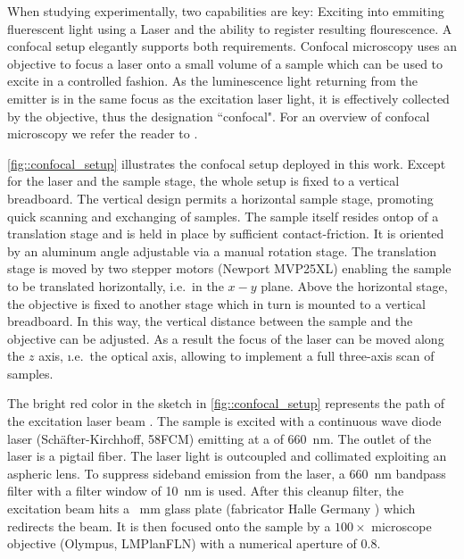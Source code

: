 		When studying \sivs experimentally, two capabilities are key: Exciting \sivs into emmiting fluerescent light using a Laser and the ability to register resulting \siv flourescence. A confocal setup elegantly supports both requirements. Confocal microscopy uses an objective to focus a laser onto a small volume of a sample which can be used to excite \sivs in a controlled fashion. As the luminescence light returning from the emitter is in the same focus as the excitation laser light, it is effectively collected by the objective, thus the designation ``confocal". For an overview of confocal microscopy we refer the reader to \cite{janine::237}.


		\autoref{fig::confocal_setup} illustrates the confocal setup deployed in this work.
		Except for the laser and the sample stage, the whole setup is fixed to a vertical breadboard.
		The vertical design permits a horizontal sample stage, promoting quick scanning and exchanging of samples.
		The sample itself resides ontop of a translation stage and is held in place by sufficient contact-friction.
		It is oriented by an aluminum angle adjustable via a manual rotation stage.
		The translation stage is moved by two stepper motors (Newport MVP25XL) enabling the sample to be translated horizontally, i.e.\ in the $x-y$ plane.
		Above the horizontal stage, the objective is fixed to another stage which in turn is mounted to a vertical breadboard.
		In this way, the vertical distance between the sample and the objective can be adjusted. As a result the focus of the laser can be moved along the $z$ axis, \i.e.\ the optical axis, allowing to implement a full three-axis scan of samples.

		The bright red color in the sketch in \autoref{fig::confocal_setup} represents the path of the excitation laser beam .
		The sample is excited with a continuous wave diode laser (Sch\"after-Kirchhoff, 58FCM) emitting at a \wl of \SI{660}{\nano\meter}.
		The outlet of the laser is a pigtail fiber.
		The laser light is outcoupled and collimated exploiting an aspheric lens.
		To suppress sideband emission from the laser, a \SI{660}{\nm} bandpass filter with a filter window of \SI{10}{\nm} is used.
		After this cleanup filter, the excitation beam hits a \SI{}{\milli\meter} glass plate (fabricator Halle Germany ) which redirects the beam. It is then focused onto the sample by a $100 \times$ microscope objective (Olympus, LMPlanFLN) with a numerical aperture of $0.8$.

